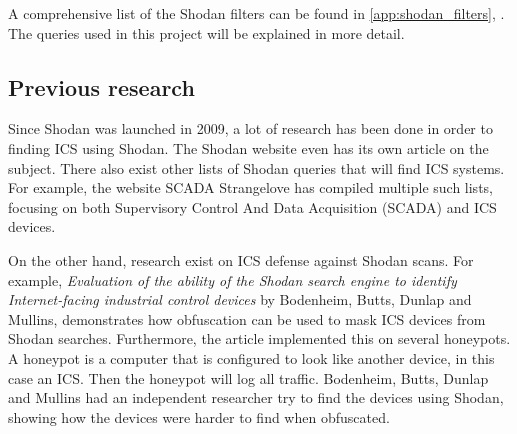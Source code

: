 A comprehensive list of the Shodan filters can be found in \cref{app:shodan_filters}, . The queries used in this project will be explained in more detail. 

\subsection{Previous research}
Since Shodan was launched in 2009, a lot of research has been done in order to finding ICS using Shodan. The Shodan website even has its own article on the subject.\cite{shodan_ics} There also exist other lists of Shodan queries that will find ICS systems. For example, the website SCADA Strangelove has compiled multiple such lists, focusing on both Supervisory Control And Data Acquisition (SCADA) and ICS devices.\cite{scadasl_cheatsheet} \cite{scadasl_shodan}

On the other hand, research exist on ICS defense against Shodan scans. For example, \textit{Evaluation of the ability of the Shodan search engine to identify Internet-facing industrial control devices} by Bodenheim, Butts, Dunlap and Mullins, \cite{bodenheim_butts_dunlap_mullins_2014} demonstrates how obfuscation can be used to mask ICS devices from Shodan searches. Furthermore, the article implemented this on several honeypots. A honeypot is a computer that is configured to look like another device, in this case an ICS. Then the honeypot will log all traffic. Bodenheim, Butts, Dunlap and Mullins had an independent researcher try to find the devices using Shodan, showing how the devices were harder to find when obfuscated.

\newpage

